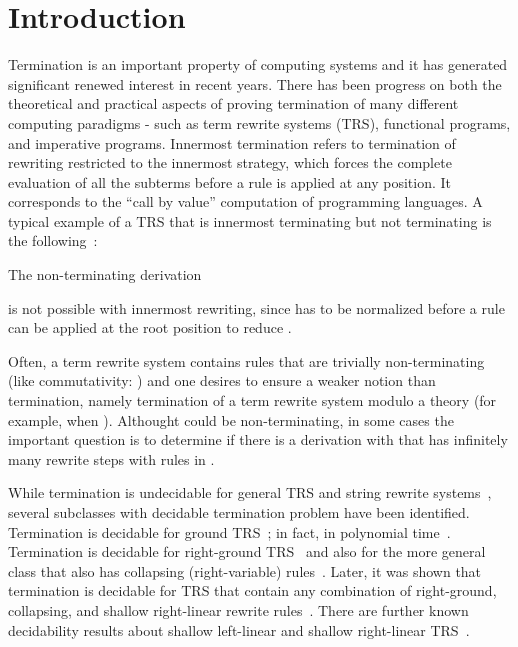 \documentclass{LMCS}
\theoremstyle{plain}
\begin{document}
\maketitle

\section{Introduction}

\noindent Termination is an important property of
computing systems and it has
generated significant renewed interest in 
recent years.  
There has been progress on both the theoretical
and practical aspects of proving
termination of many different computing 
paradigms - such as 
term rewrite systems (TRS), 
functional programs, and 
imperative programs.
Innermost termination refers to termination of rewriting
restricted to the innermost strategy, which forces
the complete evaluation of all the subterms before
a rule is applied at any position. It
corresponds to the ``call by value'' computation of programming languages.
A typical example of a TRS that is innermost terminating
but not terminating is the following~\cite{Toy87b}:

The non-terminating derivation

is not possible with innermost rewriting, since  has to
be normalized before a rule can be applied at the root position 
to reduce .

Often, a term rewrite system contains rules
that are trivially non-terminating (like commutativity:
) and one desires to ensure a weaker
notion than termination, namely 
termination of a term rewrite system  modulo a theory 
(for example, when ).
Althought  could be non-terminating, in some
cases the important question is to determine if there is
a derivation with  that has infinitely many rewrite
steps with rules in .

While termination is
undecidable for general TRS
and string rewrite systems~\cite{HuetLankford78},
several subclasses with decidable termination
problem have been identified.  
Termination is decidable for ground TRS~\cite{HuetLankford78};
in fact, in polynomial time~\cite{Plaisted93:RTA}.
Termination is decidable for right-ground
TRS~\cite{Dershowitz81:ICALP} and also for the more general class
that also has collapsing (right-variable) rules~\cite{GodoyTiwari04:IJCAR}. 
Later, it was shown that termination is decidable for
TRS that contain any combination of right-ground, collapsing, and
shallow right-linear rewrite rules~\cite{GodoyTiwari05:CADE}.
There are further known decidability results about
shallow left-linear and shallow right-linear TRS~\cite{Sakai06}.
\end{document}
